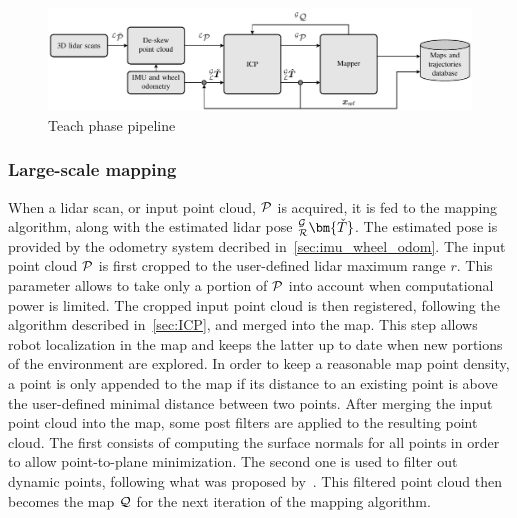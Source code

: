 \begin{figure} [htpb]
	\centering
	\includegraphics[width=\linewidth]{figs/Teach_pipeline/teach_pipeline.pdf}
	\caption{Teach phase pipeline}
	\label{fig:teach_pipeline}
\end{figure}

\subsubsection{Large-scale mapping}
\label{sec:tiled_map}


When a lidar scan, or input point cloud, $\mathcal{P}$ is acquired, it is fed to the mapping algorithm, along with the estimated lidar pose $_{\robotf}^{\mapf}\bm{\check{T}}$. %
The estimated pose is provided by the odometry system decribed in~\autoref{sec:imu_wheel_odom}.
The input point cloud  $\mathcal{P}$ is first cropped to the user-defined lidar maximum range $r$. %
This parameter allows to take only a portion of $\mathcal{P}$ into account when computational power is limited.
The cropped input point cloud is then registered, following the algorithm described in~\autoref{sec:ICP}, and merged into the map.
This step allows robot localization in the map and keeps the latter up to date when new portions of the environment are explored.
In order to keep a reasonable map point density, a point is only appended to the map if its distance to an existing point is above the user-defined minimal distance between two points.
After merging the input point cloud into the map, some post filters are applied to the resulting point cloud.
The first consists of computing the surface normals for all points in order to allow point-to-plane minimization.
The second one is used to filter out dynamic points, following what was proposed by~\citet{Pomerleau2014}.
This filtered point cloud then becomes the map $\mathcal{Q}$ for the next iteration of the mapping algorithm.

